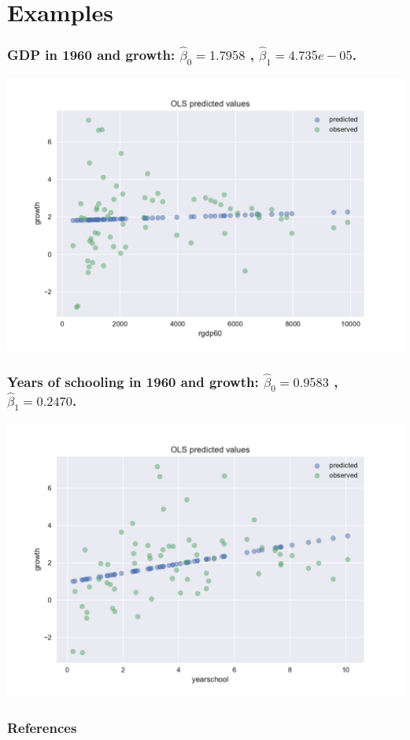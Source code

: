 \section{Examples}
\begin{frame}\frametitle{GDP in 1960 and growth: $\hat{\beta}_0 = 1.7958$ ,
    $\hat{\beta}_1 = 4.735e-05$. }

  \includegraphics[width=\figwidth,height=\figheight]{lreg_GrowthGDP}   

\end{frame}

\begin{frame}\frametitle{Years of schooling in 1960 and growth: $\hat{\beta}_0 =  0.9583$ ,
    $\hat{\beta}_1 = 0.2470$.}

  \includegraphics[width=\figwidth,height=\figheight]{lreg_GrowthSchool}   

\end{frame}


\begin{frame}[allowframebreaks]
  \frametitle{References}
 

\end{frame}


